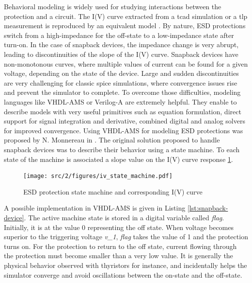 Behavioral modeling is widely used for studying interactions between the protection and a circuit.
The I(V) curve extracted from a \gls{tcad} simulation or a \gls{tlp} measurement is reproduced by an equivalent model \cite{modelling-diode-esd, esd-diode-compact-model, tvs-modeling}.
By nature, ESD protections switch from a high-impedance for the off-state to a low-impedance state after turn-on.
In the case of snapback devices, the impedance change is very abrupt, leading to discontinuities of the slope of the I(V) curve.
Snapback devices have non-monotonous curves, where multiple values of current can be found for a given voltage, depending on the state of the device.
Large and sudden discontinuities are very challenging for classic \gls{spice} simulations, where convergence issues rise and prevent the simulator to complete.
To overcome those difficulties, modeling languages like VHDL-AMS or Verilog-A are extremely helpful.
They enable to describe models with very useful primitives such as equation formulation, direct support for signal integration and derivative, combined digital and analog solvers for improved convergence.
Using VHDL-AMS for modeling ESD protections was proposed by N. Monnereau in \cite{phd-monnereau}.
The original solution proposed to handle snapback devices was to describe their behavior using a state machine.
To each state of the machine is associated a slope value on the I(V) curve response \ref{fig:esd-protection-state-machine}.

\begin{figure}[!h]
  \centering
  \texttt{[image: src/2/figures/iv\_state\_machine.pdf]}
  \caption{ESD protection state machine and corresponding I(V) curve}
  \label{fig:esd-protection-state-machine}
\end{figure}

A possible implementation in VHDL-AMS is given in Listing \ref{lst:snapback-device}.
The active machine state is stored in a digital variable called \textit{flag}.
Initially, it is at the value 0 representing the off state.
When voltage becomes superior to the triggering voltage \textit{v\_1}, \textit{flag} takes the value of 1 and the protection turns on.
For the protection to return to the off state, current flowing through the protection must become smaller than a very low value.
It is generally the physical behavior observed with thyristors for instance, and incidentally helps the simulator converge and avoid oscillations between the on-state and the off-state.

\begin{code}
\inputminted[frame=single,breaklines=true]{VHDL}{src/2/snippets/beh_snapback.vhd}
\caption{Single snapback behavioral device model}
\label{lst:snapback-device}
\end{code}

